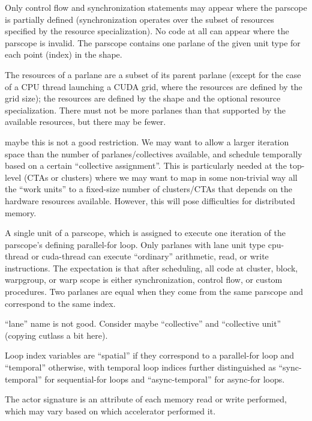 Only control flow and synchronization statements may appear where the parscope is partially defined (synchronization operates over the subset of resources specified by the resource specialization).
No code at all can appear where the parscope is invalid.
The parscope contains one parlane of the given unit type for each point (index) in the shape.

The resources of a parlane are a subset of its parent parlane (except for the case of a CPU thread launching a CUDA grid, where the resources are defined by the grid size); the resources are defined by the shape and the optional resource specialization.
There must not be more parlanes than that supported by the available resources, but there may be fewer.

 maybe this is not a good restriction.
We may want to allow a larger iteration space than the number of parlanes/collectives available, and schedule temporally based on a certain ``collective assignment''.
This is particularly needed at the top-level (CTAs or clusters) where we may want to map in some non-trivial way all the ``work units'' to a fixed-size number of clusters/CTAs that depends on the hardware resources available.
However, this will pose difficulties for distributed memory.

\filbreak
{} A single unit of a parscope, which is assigned to execute one iteration of the parscope's defining parallel-for loop.
Only parlanes with lane unit type cpu-thread or cuda-thread can execute ``ordinary'' arithmetic, read, or write instructions.
The expectation is that after scheduling, all code at cluster, block, warpgroup, or warp scope is either synchronization, control flow, or custom procedures.
Two parlanes are equal when they come from the same parscope and correspond to the same index.

 ``lane'' name is not good.
Consider maybe ``collective'' and ``collective unit'' (copying cutlass a bit here).

\filbreak
{} Loop index variables are ``spatial'' if they correspond to a parallel-for loop and ``temporal'' otherwise, with temporal loop indices further distinguished as ``sync-temporal'' for sequential-for loops and ``async-temporal'' for async-for loops.

\filbreak
{}
The actor signature is an attribute of each memory read or write performed, which may vary based on which accelerator performed it.

